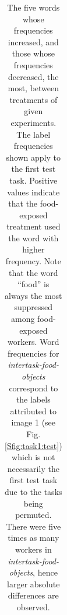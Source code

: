 \documentclass{pnastwo}
\begin{document}
\begin{table}
\begin{tabular}{ c c c c c }
	\end{tabular}
	\caption{
		The five words whose frequencies increased, and those whose 
		frequencies decreased, the most, between treatments of given 
		experiments.  The label frequencies shown apply to the first test
		task.  Positive values indicate that the food-exposed treatment
		used the word with higher frequency.  
		Note that the word ``food'' is always the most suppressed among
		food-exposed workers.  Word frequencies for 
		\textit{intertask-food-objects} correspond to the labels attributed
		to image 1 (see Fig. \ref{Sfig:task1:test}) which is not necessarily 
		the first 
		test task due to the tasks being permuted.  There were five times
		as many workers in \textit{intertask-food-objects}, hence
		larger absolute differences are observed.
	}
	\label{table:top-words}
\end{table}
\end{document}

